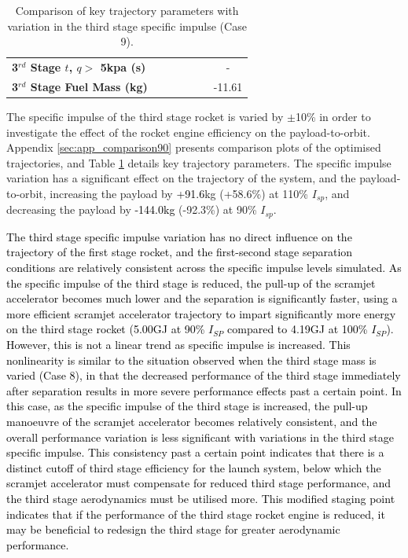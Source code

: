 \begin{table}[ht]
\begin{tabular}{l c c c c c c}
		\textbf{3$^{rd}$ Stage $t$, $q >$ 5kpa (s)}
		& \thirdqOverFiveISPThreeNinetyNoReturn
		& \thirdqOverFiveISPThreeNinetyFiveNoReturn
		& \thirdqOverFiveISPThreeStandardNoReturn
		& \thirdqOverFiveISPThreeOneHundredFiveNoReturn
		& \thirdqOverFiveISPThreeOneHundredTenNoReturn
		& -
		\\
		\textbf{3$^{rd}$ Stage Fuel Mass (kg)}
		& \thirdmFuelISPThreeNinetyNoReturn
		& \thirdmFuelISPThreeNinetyFiveNoReturn
		& \thirdmFuelISPThreeStandardNoReturn
		& \thirdmFuelISPThreeOneHundredFiveNoReturn
		& \thirdmFuelISPThreeOneHundredTenNoReturn
		&-11.61
		\\
		\hline 
	\end{tabular} 
	\caption{Comparison of key trajectory parameters with variation in the third stage specific impulse (Case 9).}
	\label{tab:comparison90}
\end{table}
\noindent
The specific impulse of the third stage rocket is varied by $\pm$10\% in order to investigate the effect of the rocket engine efficiency on the payload-to-orbit. Appendix \ref{sec:app_comparison90} presents comparison plots of the optimised trajectories, and Table \ref{tab:comparison90} details key trajectory parameters. 
The specific impulse variation has a significant effect on the trajectory of the system, and the payload-to-orbit, increasing the payload by \textcolor{black}{+91.6}kg (+58.6\%) at 110\% $I_{sp}$, and decreasing the payload by \textcolor{black}{-144.0kg} (-92.3\%) at 90\% $I_{sp}$. 

\textcolor{black}{
The third stage specific impulse variation has no direct influence on the trajectory of the first stage rocket, and the first-second stage separation conditions are relatively consistent across the specific impulse levels simulated.
As the specific impulse of the third stage is reduced, the pull-up of the scramjet accelerator becomes much lower and the separation is significantly faster, using a more efficient scramjet accelerator trajectory to impart significantly more energy on the third stage rocket (5.00GJ at 90\% $I_{SP}$ compared to 4.19GJ at 100\% $I_{SP}$). However, this is not a linear trend as specific impulse is increased. This nonlinearity is similar to the situation observed when the third stage mass is varied (Case 8), in that the decreased performance of the third stage immediately after separation results in more severe performance effects past a certain point. In this case, as the specific impulse of the third stage is increased, the pull-up manoeuvre of the scramjet accelerator becomes relatively consistent, and the overall performance variation is less significant with variations in the third stage specific impulse. This consistency past a certain point indicates that there is a distinct cutoff of third stage efficiency for the launch system, below which the scramjet accelerator must compensate for reduced third stage performance, and the third stage aerodynamics must be utilised more. This modified staging point indicates that if the performance of the third stage rocket engine is reduced, it may be beneficial to redesign the third stage for greater aerodynamic performance. 
}



